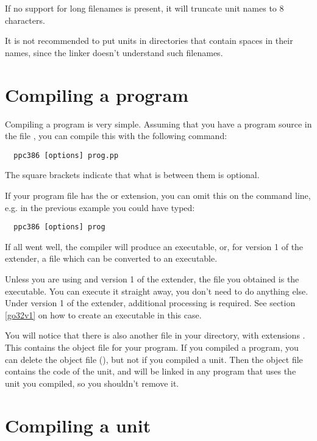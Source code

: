 \documentclass{report}
\begin{document}
If no support for long filenames is present, it will truncate unit names
to 8 characters.

It is not recommended to put units in directories that contain spaces in
their names, since the linker doesn't understand such filenames.

\section{Compiling a program}
Compiling a program is very simple. Assuming that you have a program source
in the file , you can compile this with the following command:
\begin{verbatim}
  ppc386 [options] prog.pp
\end{verbatim}
The square brackets \var{[\ ]} indicate that what is between them is optional.

If your program file has the  or  extension,
you can omit this on the command line, e.g. in the previous example you
could have typed:
\begin{verbatim}
  ppc386 [options] prog
\end{verbatim}

If all went well, the compiler will produce an executable, or, for version 1
of the \dos extender, a file which can be converted to an executable.

Unless you are using \dos and version 1 of the \dos extender,
the file you obtained is the executable.
You can execute it straight away, you don't need to do
anything else. Under version 1 of the \dos extender,
additional processing is required. See section \ref{go32v1} on how to
create an executable in this case.

You will notice that there is also another file in your directory, with
extensions . This contains the object file for your program.
If you compiled a program, you can delete the object file (),
but not if you compiled a unit.
Then the object file contains the code of the unit, and will be
linked in any program that uses the unit you compiled, so you shouldn't
remove it.


\section{Compiling a unit}
\end{document}
